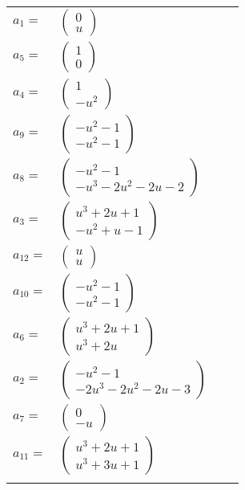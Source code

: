 \documentclass[1p]{elsarticle_modified}
\theoremstyle{definition}
\begin{document}
\begin{tabular}{m{7pt} m{180pt} m{7pt} m{180pt} }
\flushright $a_{1}=$&$\begin{pmatrix}0\\u\end{pmatrix}$ \\
\flushright $a_{5}=$&$\begin{pmatrix}1\\0\end{pmatrix}$ \\
\flushright $a_{4}=$&$\begin{pmatrix}1\\- u^2\end{pmatrix}$ \\
\flushright $a_{9}=$&$\begin{pmatrix}- u^2-1\\- u^2-1\end{pmatrix}$ \\
\flushright $a_{8}=$&$\begin{pmatrix}- u^2-1\\- u^3-2 u^2-2 u-2\end{pmatrix}$ \\
\flushright $a_{3}=$&$\begin{pmatrix}u^3+2 u+1\\- u^2+u-1\end{pmatrix}$ \\
\flushright $a_{12}=$&$\begin{pmatrix}u\\u\end{pmatrix}$ \\
\flushright $a_{10}=$&$\begin{pmatrix}- u^2-1\\- u^2-1\end{pmatrix}$ \\
\flushright $a_{6}=$&$\begin{pmatrix}u^3+2 u+1\\u^3+2 u\end{pmatrix}$ \\
\flushright $a_{2}=$&$\begin{pmatrix}- u^2-1\\-2 u^3-2 u^2-2 u-3\end{pmatrix}$ \\
\flushright $a_{7}=$&$\begin{pmatrix}0\\- u\end{pmatrix}$ \\
\flushright $a_{11}=$&$\begin{pmatrix}u^3+2 u+1\\u^3+3 u+1\end{pmatrix}$\\&\end{tabular}
\end{document}
